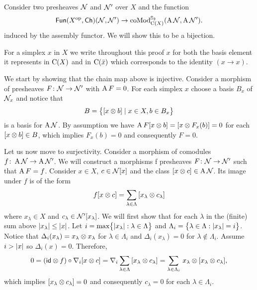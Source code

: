 
Consider two presheaves $\cN$ and $\cN'$ over $X$ and the function
\[
\Fun(X^\op, \Ch)(\cN, \cN') \to \coMod^{\Sym_2}_{\chains(X)}(\assembly \cN, \assembly \cN').
\]
induced by the assembly functor.
We will show this to be a bijection.

For a simplex $x$ in $X$ we write throughout this proof $x$ for both the basis element it represents in $\chains(X)$ and in $\chains(\bar x)$ which corresponds to the identity $(x \to x)$.

We start by showing that the chain map above is injective.
Consider a morphism of presheaves $F \colon \cN \to \cN'$ with $\assembly F = 0$.
For each simplex $x$ choose a basis $B_x$ of $\cN_x$ and notice that
\[
B = \set[\big]{[x \ot b] \mid x \in X, b \in B_x}
\]
is a basis for $\assembly \cN$.
By assumption we have $\assembly F [x \ot b] = [x \ot F_x(b)] = 0$ for each $[x \ot b] \in B$, which implies $F_x(b) = 0$ and consequently $F = 0$.

Let us now move to surjectivity.
Consider a morphism of comodules $f \colon \assembly \cN \to \assembly \cN'$.
We will construct a morphisms f presheaves $F \colon \cN \to \cN'$ such that $\assembly F = f$.
Consider $x \in X$, $c \in \cN[x]$ and the class $[x \ot c] \in \assembly \cN$.
Its image under $f$ is of the form
\[
f[x \ot c] = \sum_{\lambda \in \Lambda} \, [x_\lambda \ot c_\lambda]
\]
where $x_\lambda \in X$ and $c_\lambda \in \cN'[x_\lambda]$.
We will first show that for each $\lambda$ in the (finite) sum above $\bars{x_\lambda} \leq \bars{x}$.
Let $i = \max \set[\big]{\bars{x_\lambda} : \lambda \in \Lambda}$ and $\Lambda_i = \set[\big]{\lambda \in \Lambda : \bars{x_\lambda} = i}$.
Notice that $\Delta_i(x_{\lambda}) = x_{\lambda} \ot x_{\lambda}$ for $\lambda \in \Lambda_i$ and $\Delta_i(x_{\lambda}) = 0$ for $\lambda \notin \Lambda_i$.
Assume $i > \bars{x}$ so $\Delta_i(x) = 0$.
Therefore,
\begin{align*}
	0 =
	(\id \ot f) \circ \nabla_i [x \ot c] =
	\nabla_i \sum_{\lambda \in \Lambda} \, [x_\lambda \ot c_\lambda] =
	\sum_{\lambda \in \Lambda_i} \, x_\lambda \ot [x_\lambda \ot c_\lambda],
\end{align*}
which implies $[x_\lambda \ot c_\lambda] = 0$ and consequently $c_{\lambda} = 0$ for each $\lambda \in \Lambda_i$.

